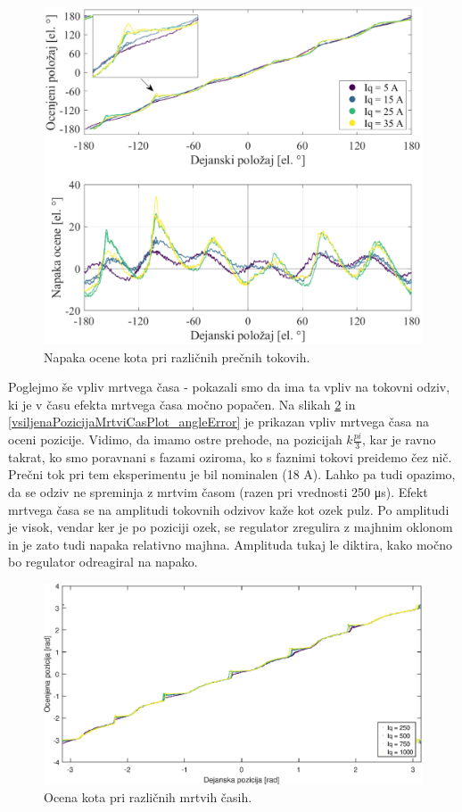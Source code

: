 \documentclass[a4paper,twoside,openright,12pt,slovene]{book}
\begin{document}
\begin{figure}[!htbp]
    \centering
    \includegraphics[width=1.0\columnwidth]{Slike/vsiljenaPozicijaTokovi_angleError.eps}
    \caption{\label{vsiljenaPozicijaTokovi_angleError} Napaka ocene kota pri različnih prečnih tokovih. }
\end{figure}

Poglejmo še vpliv mrtvega časa - pokazali smo da ima ta vpliv na tokovni odziv, ki je v času efekta mrtvega časa močno popačen. Na slikah \ref{vsiljenaPozicijaMrtviCasPlot_angle} in
\ref{vsiljenaPozicijaMrtviCasPlot_angleError} je prikazan vpliv mrtvega časa na oceni pozicije. Vidimo, da imamo ostre prehode, na pozicijah $k\frac{pi}{3}$, kar je ravno takrat, ko smo poravnani s
fazami oziroma, ko s faznimi tokovi preidemo čez nič. Prečni tok pri tem eksperimentu je bil nominalen (18 A). Lahko pa tudi opazimo, da se odziv ne spreminja z mrtvim časom (razen pri vrednosti
250 μs). Efekt mrtvega časa se na amplitudi tokovnih odzivov kaže kot ozek pulz. Po amplitudi je visok, vendar ker je po poziciji ozek, se regulator zregulira z majhnim oklonom in je zato tudi napaka
relativno majhna. Amplituda tukaj le diktira, kako močno bo regulator odreagiral na napako.

\begin{figure}[!htbp]
    \centering
    \includegraphics[width=0.9\columnwidth]{Slike/vsiljenaPozicijaMrtviCasPlot_angle.eps}
    \caption{\label{vsiljenaPozicijaMrtviCasPlot_angle} Ocena kota pri različnih mrtvih časih. }
\end{figure}
\end{document}
